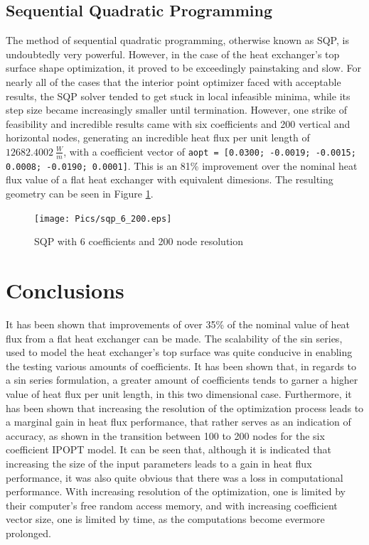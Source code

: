 \documentclass{article}
\begin{document}
\subsection{Sequential Quadratic Programming}
The method of sequential quadratic programming, otherwise known as SQP, is undoubtedly very powerful. However, in the case of the heat exchanger's top surface shape optimization, it proved to be exceedingly painstaking and slow. For nearly all of the cases that the interior point optimizer faced with acceptable results, the SQP solver tended to get stuck in local infeasible minima, while its step size became increasingly smaller until termination. However, one strike of feasibility and incredible results came with six coefficients and 200 vertical and horizontal nodes, generating an incredible heat flux per unit length of $12682.4002~\frac{W}{m}$, with a coefficient vector of \lstinline[]{aopt = [0.0300; -0.0019; -0.0015; 0.0008; -0.0190; 0.0001]}. This is an 81\% improvement over the nominal heat flux value of a flat heat exchanger with equivalent dimesions. The resulting geometry can be seen in Figure \ref{fig:sqp_6_200}.

\begin{figure}
    \centering
    \texttt{[image: Pics/sqp\_6\_200.eps]}
    \caption{SQP with 6 coefficients and 200 node resolution}
    \label{fig:sqp_6_200}
\end{figure}

\section{Conclusions}
It has been shown that improvements of over 35\% of the nominal value of heat flux from a flat heat exchanger can be made. The scalability of the sin series, used to model the heat exchanger's top surface was quite conducive in enabling the testing various amounts of coefficients. It has been shown that, in regards to a sin series formulation, a greater amount of coefficients tends to garner a higher value of heat flux per unit length, in this two dimensional case. Furthermore, it has been shown that increasing the resolution of the optimization process leads to a marginal gain in heat flux performance, that rather serves as an indication of accuracy, as shown in the transition between 100 to 200 nodes for the six coefficient IPOPT model. It can be seen that, although it is indicated that increasing the size of the input parameters leads to a gain in heat flux performance, it was also quite obvious that there was a loss in computational performance. With increasing resolution of the optimization, one is limited by their computer's free random access memory, and with increasing coefficient vector size, one is limited by time, as the computations become evermore prolonged.
\end{document}
